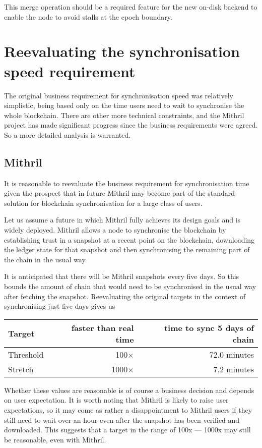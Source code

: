 \documentclass[11pt,a4paper]{article}
\begin{document}
This merge operation should be a required feature for the new on-disk backend
to enable the node to avoid stalls at the epoch boundary.


\section{Reevaluating the synchronisation speed requirement}

The original business requirement for synchronisation speed was relatively
simplistic, being based only on the time users need to wait to synchronise the
whole blockchain. There are other more technical constraints, and the Mithril
project has made significant progress since the business requirements were
agreed. So a more detailed analysis is warranted.

\subsection{Mithril}

It is reasonable to reevaluate the business requirement for synchronisation
time given the prospect that in future Mithril may become part of the standard
solution for blockchain synchronisation for a large class of users.

Let us assume a future in which Mithril fully achieves its design goals and is
widely deployed. Mithril allows a node to synchronise the blockchain by
establishing trust in a snapshot at a recent point on the blockchain,
downloading the ledger state for that snapshot and then synchronising the
remaining part of the chain in the usual way.

It is anticipated that there will be Mithril snapshots every five days. So this
bounds the amount of chain that would need to be synchronised in the usual way
after fetching the snapshot. Reevaluating the original targets in the context
of synchronising just five days gives us
\begin{center}
\begin{tabular}[]{lrr}
  Target    & faster than real time & time to sync 5 days of chain \\
  \toprule
  Threshold &  100$\times$ & 72.0 minutes \\
  Stretch   & 1000$\times$ &  7.2 minutes
\end{tabular}
\end{center}
Whether these values are reasonable is of course a business decision and
depends on user expectation. It is worth noting that Mithril is likely to
raise user expectations, so it may come as rather a disappointment to Mithril
users if they still need to wait over an hour even after the snapshot has been
verified and downloaded. This suggests that a target in the range of
100x --- 1000x may still be reasonable, even with Mithril.
\end{document}

